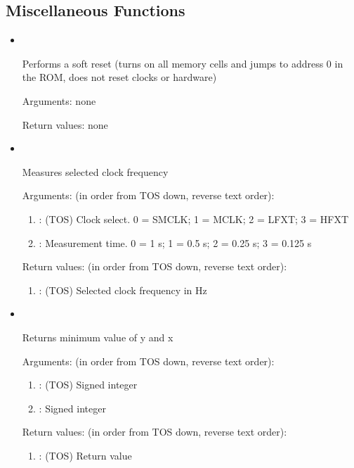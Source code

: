 \subsection{Miscellaneous Functions}
\begin{itemize}

\item {}\ \forthinline{( -- )}

\noindent Performs a soft reset (turns on all memory cells and jumps to address 0 in the ROM, does not reset clocks or hardware)

\noindent Arguments: none

\noindent Return values: none

\item {}\ 

\noindent Measures selected clock frequency

\noindent Arguments: (in order from TOS down, reverse text order):
\begin{enumerate}
\item {}: (TOS) Clock select. 0 = SMCLK; 1 = MCLK; 2 = LFXT; 3 = HFXT
\item {}: Measurement time. 0 = 1 s; 1 = 0.5 s; 2 = 0.25 s; 3 = 0.125 s
\end{enumerate}

\noindent Return values: (in order from TOS down, reverse text order):
\begin{enumerate}
\item {}: (TOS) Selected clock frequency in Hz
\end{enumerate}

\item {}\ 

\noindent Returns minimum value of y and x

\noindent Arguments: (in order from TOS down, reverse text order):
\begin{enumerate}
\item {}: (TOS) Signed integer
\item {}: Signed integer
\end{enumerate}

\noindent Return values: (in order from TOS down, reverse text order):
\begin{enumerate}
\item {}: (TOS) Return value
\end{enumerate}


\end{itemize}
